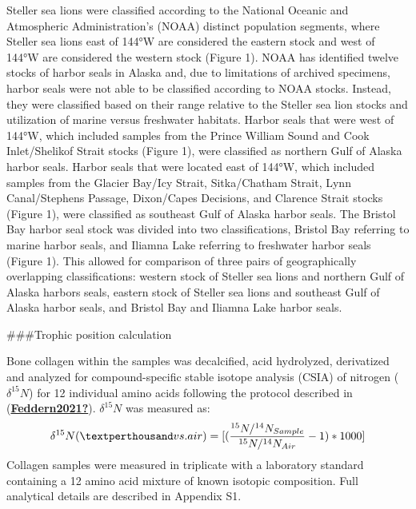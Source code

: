 \documentclass [11pt, proquest] {uwthesis}[2015/03/03]
\begin{document}
Steller sea lions were classified according to the National Oceanic and Atmospheric Administration's (NOAA) distinct population segments, where Steller sea lions east of 144°W are considered the eastern stock and west of 144°W are considered the western stock (Figure 1). NOAA has identified twelve stocks of harbor seals in Alaska and, due to limitations of archived specimens, harbor seals were not able to be classified according to NOAA stocks. Instead, they were classified based on their range relative to the Steller sea lion stocks and utilization of marine versus freshwater habitats. Harbor seals that were west of 144°W, which included samples from the Prince William Sound and Cook Inlet/Shelikof Strait stocks (Figure 1), were classified as northern Gulf of Alaska harbor seals. Harbor seals that were located east of 144°W, which included samples from the Glacier Bay/Icy Strait, Sitka/Chatham Strait, Lynn Canal/Stephens Passage, Dixon/Capes Decisions, and Clarence Strait stocks (Figure 1), were classified as southeast Gulf of Alaska harbor seals. The Bristol Bay harbor seal stock was divided into two classifications, Bristol Bay referring to marine harbor seals, and Iliamna Lake referring to freshwater harbor seals (Figure 1). This allowed for comparison of three pairs of geographically overlapping classifications: western stock of Steller sea lions and northern Gulf of Alaska harbors seals, eastern stock of Steller sea lions and southeast Gulf of Alaska harbor seals, and Bristol Bay and Iliamna Lake harbor seals.

\#\#\#Trophic position calculation

Bone collagen within the samples was decalcified, acid hydrolyzed, derivatized and analyzed for compound-specific stable isotope analysis (CSIA) of nitrogen (\(\delta^{15}N\)) for 12 individual amino acids following the protocol described in (\protect\hyperlink{ref-Feddern2021}{\textbf{Feddern2021?}}). \(\delta^{15}N\) was measured as:
\begin{equation} 
  \delta^{15}N ( \textperthousand vs. air) =   
  [(\frac{^{15}N/^{14}N_{Sample}}{^{15}N/^{14}N_{Air}} -1)*1000]
  \label{eq:deltN2}
\end{equation}
Collagen samples were measured in triplicate with a laboratory standard containing a 12 amino acid mixture of known isotopic composition. Full analytical details are described in Appendix S1.
\end{document}
